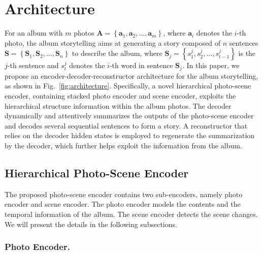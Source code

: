 \documentclass[letterpaper]{article} \usepackage{aaai19}  \usepackage{times}  \usepackage{helvet}  \usepackage{courier}  \usepackage{url}  \usepackage{graphicx}  \usepackage{color}
\begin{document}
\section{Architecture}
For an album with $m$ photos $\mathbf{A}=\left\{\mathbf{a}_1,\mathbf{a}_2, \dots ,\mathbf{a}_m\right\}$, where $\mathbf{a}_i$ denotes the $i$-th photo, the album storytelling aims at generating a story composed of $n$ sentences $\mathbf{S}=\left\{\mathbf{S}_1,\mathbf{S}_2, \dots ,\mathbf{S}_n\right\}$ to describe the album, where $\mathbf{S}_{j} = \left\{s_1^j, s_2^j,\dots, s_{t-1}^j \right\} $ is the $j$-th sentence and $s_{t}^j$ denotes the $i$-th word in sentence $\mathbf{S}_{j}$.
In this paper, we propose an encoder-decoder-reconstructor architecture for the album storytelling, as shown in Fig.~\ref{fig:architecture}.  Specifically, a novel hierarchical photo-scene encoder, containing stacked photo encoder and scene encoder, exploits the hierarchical structure information within the album photos. The decoder dynamically and attentively summarizes the outputs of the photo-scene encoder and decodes several sequential sentences to form a story. A reconstructor that relies on the decoder hidden states is employed to regenerate the summarization by the decoder, which further helps  exploit the information from the album.




\subsection{Hierarchical Photo-Scene Encoder}
The proposed photo-scene encoder contains two sub-encoders, namely photo encoder and scene encoder. The photo encoder models the contents and the temporal information of the album. The scene encoder detects the scene changes. We will present the details in the following subsections.

\subsubsection{Photo Encoder.}
\end{document}
